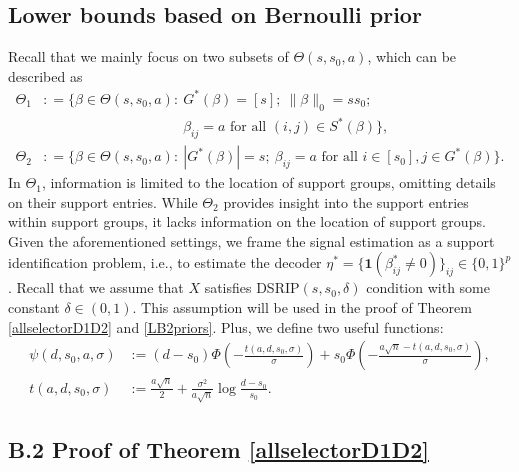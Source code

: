 \documentclass[12pt]{article}
\begin{document}
\begin{appendix}
\subsection{Lower bounds based on Bernoulli prior}\label{Bernoulli}
Recall that we mainly focus on two subsets of ${\Theta}(s,s_0,a)$, which can be described as 
\begin{align*}
{\Theta}_1 &: = \Big\{\beta \in {\Theta}(s,s_0,a): 
~ G^*(\beta ) = [s]; ~ \| \beta\|_0 = ss_0;\\
&\qquad\qquad\qquad\qquad\qquad \beta_{ij} = a \text{  for all } (i,j) \in S^*(\beta) \Big\},\\
{\Theta}_2&: = \Big\{{\beta} \in {\Theta}(s,s_0,a): 
~ |G^*(\beta)| = s;~ \beta_{ij} =a  \text{  for all }  i \in [s_0], j \in G^*(\beta) \Big\}.
\end{align*}
In ${\Theta}_1$, information is limited to the location of support groups, omitting details on their support entries. 
While ${\Theta}_2$ provides insight into the support entries within support groups, it lacks information on the location of support groups.
Given the aforementioned settings, we frame the signal estimation as a support identification problem,
i.e., to estimate the decoder $\eta^* = \{\mathbf{1}(\beta^*_{ij} \ne 0) \}_{ij}\in \{0,1\}^{p}$. 
Recall that we assume that $X$ satisfies DSRIP$(s,s_0,\delta)$ condition with some constant $\delta \in (0,1)$. This assumption will be used in the proof of Theorem \ref{allselectorD1D2} and \ref{LB2priors}.
Plus, we define two useful functions:
\begin{equation}\label{aux2fun}
\begin{aligned}
    \psi(d,s_0,a,\sigma) &:=(d-s_0){\Phi}\left(-\frac{t(a,d,s_0,\sigma)}{\sigma}\right) + s_0 {\Phi}\left(-\frac{a\sqrt n-t(a,d,s_0,\sigma)}{\sigma}\right),\\
    t(a,d,s_0,\sigma) &:= \frac{a\sqrt n}{2} + \frac{\sigma^2}{a\sqrt n} \log \frac{d-s_0}{s_0}.
\end{aligned}
\end{equation}
 
\subsection*{B.2 Proof of Theorem \ref{allselectorD1D2}}
 

\end{appendix}
\end{document}
